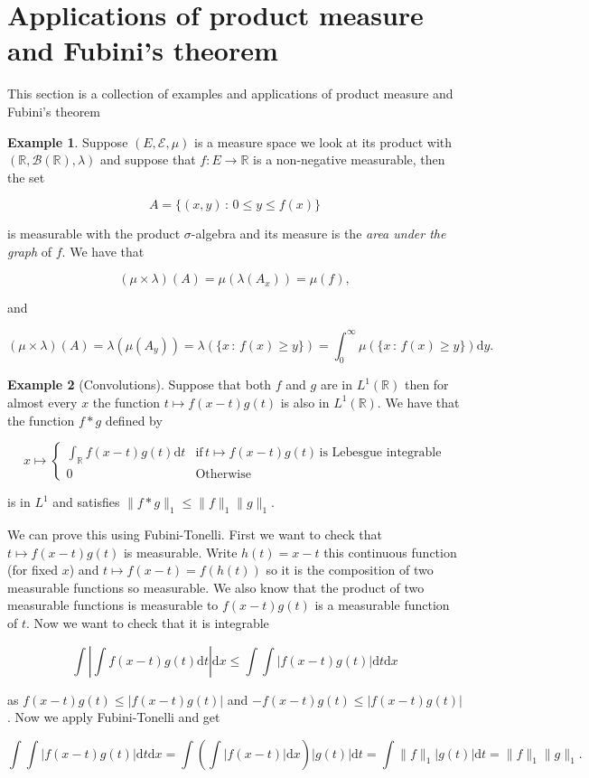 \documentclass[
]{book}
\theoremstyle{definition}
\theoremstyle{definition}
\newtheorem{example}{Example}[chapter]
\theoremstyle{definition}
\theoremstyle{definition}
\theoremstyle{remark}
\begin{document}
\hypertarget{applications-of-product-measure-and-fubinis-theorem}{%
\section{Applications of product measure and Fubini's theorem}\label{applications-of-product-measure-and-fubinis-theorem}}

This section is a collection of examples and applications of product measure and Fubini's theorem

\begin{example}
Suppose \((E, \mathcal{E}, \mu)\) is a measure space we look at its product with \((\mathbb{R}, \mathcal{B}(\mathbb{R}), \lambda)\) and suppose that \(f:E \rightarrow \mathbb{R}\) is a non-negative measurable, then the set

\[ A = \{(x,y) \,:\, 0 \leq y \leq f(x) \} \]

is measurable with the product \(\sigma\)-algebra and its measure is the \emph{area under the graph} of \(f\). We have that

\[ (\mu \times \lambda)(A) = \mu( \lambda(A_x)) = \mu(f),  \]

and

\[ (\mu \times \lambda)(A) = \lambda( \mu(A_y)) = \lambda (\{ x \,:\, f(x) \geq y \}) = \int_0^ \infty \mu(\{x \,:\, f(x) \geq y\}) \mathrm{d}y. \]
\end{example}

\begin{example}[Convolutions]
Suppose that both \(f\) and \(g\) are in \(L^1(\mathbb{R})\) then for almost every \(x\) the function \(t \mapsto f(x-t) g(t)\) is also in \(L^1(\mathbb{R})\). We have that the function \(f*g\) defined by

\[x \mapsto \left\{ \begin{array}{ll} \int_{\mathbb{R}} f(x-t)g(t) \mathrm{d}t & \mbox{if}\, t \mapsto f(x-t)g(t)\, \mbox{is Lebesgue integrable} \\
0 & \mbox{Otherwise} \end{array}\right. \]

is in \(L^1\) and satisfies \(\|f*g\|_1 \leq \|f\|_1 \|g\|_1\).

We can prove this using Fubini-Tonelli. First we want to check that \(t \mapsto f(x-t)g(t)\) is measurable. Write \(h(t) = x-t\) this continuous function (for fixed \(x\)) and \(t \mapsto f(x-t) = f(h(t))\) so it is the composition of two measurable functions so measurable. We also know that the product of two measurable functions is measurable to \(f(x-t)g(t)\) is a measurable function of \(t\). Now we want to check that it is integrable

\[ \int \left| \int f(x-t)g(t) \mathrm{d}t \right| \mathrm{d}x \leq \int \int |f(x-t)g(t)| \mathrm{d}t \mathrm{d}x \]

as \(f(x-t)g(t) \leq |f(x-t)g(t)|\) and \(-f(x-t)g(t) \leq |f(x-t)g(t)|\). Now we apply Fubini-Tonelli and get

\[ \int \int |f(x-t)g(t)| \mathrm{d}t \mathrm{d}x = \int \left( \int |f(x-t)| \mathrm{d}x\right) |g(t)| \mathrm{d}t = \int \|f\|_1 |g(t)| \mathrm{d}t = \|f\|_1 \|g\|_1. \]
\end{example}
\end{document}
